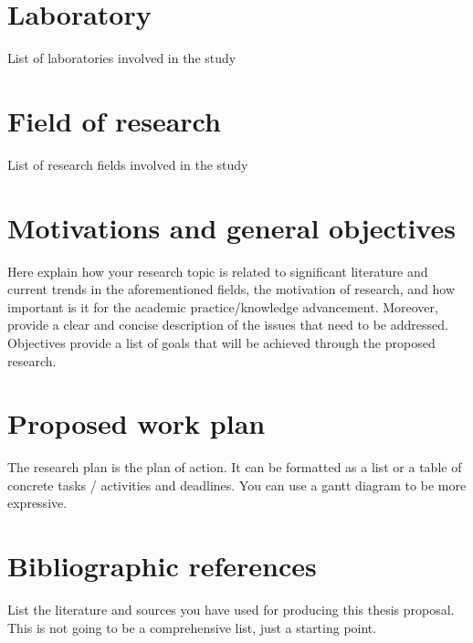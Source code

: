 \documentclass{article}
\begin{document}



\section{Laboratory}
List of laboratories involved in the study


\section{Field of research}
List of research fields involved in the study 


\section{Motivations and general objectives}
Here explain how your research topic is related to significant literature and current trends in the aforementioned fields, the motivation of research, and how important is it for the academic practice/knowledge advancement. Moreover, provide a clear and concise description of the issues that need to be addressed. Objectives provide a list of goals that will be achieved through the proposed research. 


\section{Proposed work plan}
 \vspace{-0.2cm}

The research plan is the plan of action. It can be formatted as a list or a table of concrete tasks / activities and deadlines. You can use a gantt diagram to be more expressive. 

\section{Bibliographic references}
List the literature and sources you have used for producing this thesis proposal. This is not going to be a comprehensive list, just a starting point.
%
%
\end{document}
